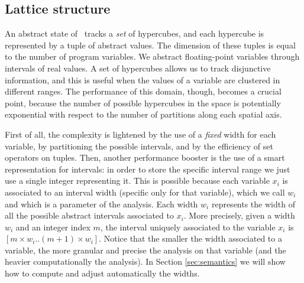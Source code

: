 \subsection{Lattice structure}
\vspace{-5pt}
An abstract state of \adomain\ tracks a \emph{set} of hypercubes, and each hypercube is represented by a tuple of abstract values. The dimension of these tuples is equal to the number of program variables.
We abstract floating-point variables through intervals of real values. A set of hypercubes allows us to track disjunctive information, and this is useful when the values of a variable are clustered in different ranges.
The performance of this domain, though, becomes a crucial point, because the number of possible hypercubes in the space is potentially exponential with respect to the number of partitions along each spatial axis. 

First of all, the complexity is lightened by the use of a \emph{fixed} width for each variable, by partitioning the possible intervals, and by the efficiency of set operators on tuples. Then, another performance booster is the use of a smart representation for intervals: in order to store the specific interval range we just use a single integer representing it. This is possible because each variable $x_i$ is associated to an interval width (specific only for that variable), which we call $w_i$ and which is a parameter of the analysis. Each width $w_i$ represents the width of all the possible abstract intervals associated to $x_i$. More precisely, given a width $w_i$ and an integer index $m$, the interval uniquely associated to the variable $x_i$ is $[m \times w_i .. (m+1) \times w_i]$. Notice that the smaller the width associated to a variable, the more granular and precise the analysis on that variable (and the heavier computationally the analysis). In Section \ref{sec:semantics} we will show how to compute and adjust automatically the widths.


